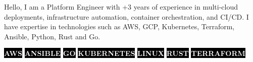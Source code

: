 \documentclass[10pt]{developercv} %
\begin{document}
\vspace{0.5cm}



\hspace{6pt}\begin{minipage}[t]{0.98\textwidth} %
	\vspace{-\baselineskip} %

	{Hello, I am a Platform Engineer with +3 years of experience in multi-cloud deployments, infrastructure automation, container orchestration, and CI/CD. I have expertise in technologies such as AWS, GCP, Kubernetes, Terraform, Ansible, Python, Rust and Go.} %

\end{minipage}
\hfill %



\begin{center}
	\colorbox{black}{{\textcolor{white}{\textbf{\MakeUppercase{AWS}}}}}
	\colorbox{black}{{\textcolor{white}{\textbf{\MakeUppercase{Ansible}}}}}
	\colorbox{black}{{\textcolor{white}{\textbf{\MakeUppercase{Go}}}}}
	\colorbox{black}{{\textcolor{white}{\textbf{\MakeUppercase{Kubernetes}}}}}
	\colorbox{black}{{\textcolor{white}{\textbf{\MakeUppercase{Linux}}}}}
	\colorbox{black}{{\textcolor{white}{\textbf{\MakeUppercase{Rust}}}}}
	\colorbox{black}{{\textcolor{white}{\textbf{\MakeUppercase{Terraform}}}}}
\end{center}


\end{document}
